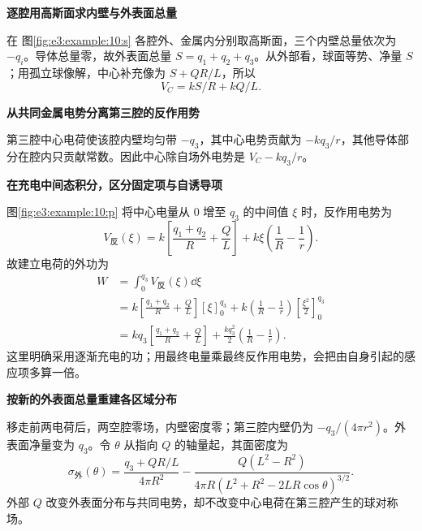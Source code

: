 \begin{solution}\textbf{逐腔用高斯面求内壁与外表面总量}\par\nobreak
在 图\ref{fig:e3:example:10:s} 各腔外、金属内分别取高斯面，三个内壁总量依次为 $-q_i$。导体总量零，故外表面总量 $S=q_1+q_2+q_3$。从外部看，球面等势、净量 $S$；用孤立球像解，中心补充像为 $S+QR/L$，所以
\[
 V_C=kS/R+kQ/L.
\]


\par\medskip{}\noindent\textbf{从共同金属电势分离第三腔的反作用势}\par\nobreak
第三腔中心电荷使该腔内壁均匀带 $-q_3$，其中心电势贡献为 $-kq_3/r$，其他导体部分在腔内只贡献常数。因此中心除自场外电势是 $V_C-kq_3/r$。



\par\medskip{}\noindent\textbf{在充电中间态积分，区分固定项与自诱导项}\par\nobreak
图\ref{fig:e3:example:10:p} 将中心电量从 $0$ 增至 $q_3$ 的中间值 $\xi$ 时，反作用电势为
\[
 V_{\text{反}}(\xi)=k\left[\frac{q_1+q_2}{R}+\frac QL\right]
 +k\xi\left(\frac1R-\frac1r\right).
\]
故建立电荷的外功为
\[
 \begin{aligned}
 W&=\int_0^{q_3}V_{\text{反}}(\xi)\dd\xi\\
 &=k\left[\frac{q_1+q_2}{R}+\frac QL\right][\xi]_0^{q_3}
 +k\left(\frac1R-\frac1r\right)\left[\frac{\xi^2}{2}\right]_0^{q_3}\\
 &=kq_3\left[\frac{q_1+q_2}{R}+\frac QL\right]
 +\frac{kq_3^2}2\left(\frac1R-\frac1r\right).
\end{aligned}
\]
这里明确采用逐渐充电的功；用最终电量乘最终反作用电势，会把由自身引起的感应项多算一倍。



\par\medskip{}\noindent\textbf{按新的外表面总量重建各区域分布}\par\nobreak
移走前两电荷后，两空腔零场，内壁密度零；第三腔内壁仍为 $-q_3/(4\pi r^2)$。外表面净量变为 $q_3$。令 $\theta$ 从指向 $Q$ 的轴量起，其面密度为
\[
 \sigma_{\text{外}}(\theta)=\frac{q_3+QR/L}{4\pi R^2}
 -\frac{Q(L^2-R^2)}{4\pi R(L^2+R^2-2LR\cos\theta)^{3/2}}.
\]
外部 $Q$ 改变外表面分布与共同电势，却不改变中心电荷在第三腔产生的球对称场。\end{solution}
